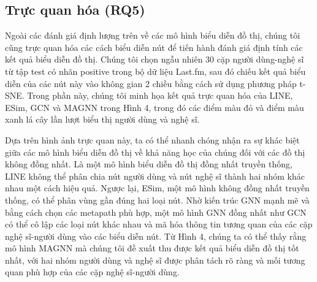 \subsection{Trực quan hóa (RQ5)}
Ngoài các đánh giá định lượng trên về các mô hình biểu diễn đồ thị, chúng tôi cũng trực quan hóa các cách biểu diễn nút để tiến hành đánh giá định tính các kết quả biểu diễn đồ thị. Chúng tôi chọn ngẫu nhiên 30 cặp người dùng-nghệ sĩ từ tập test có nhãn positive trong bộ dữ liệu Last.fm, sau đó chiếu kết quả biểu diễn của các nút này vào không gian 2 chiều bằng cách sử dụng phương pháp t-SNE. Trong phần này, chúng tôi minh họa kết quả trực quan hóa của LINE, ESim, GCN và MAGNN trong Hình 4, trong đó các điểm màu đỏ và điểm màu xanh lá cây lần lượt biểu thị người dùng và nghệ sĩ.

Dựa trên hình ảnh trực quan này, ta có thể nhanh chóng nhận ra sự khác biệt giữa các mô hình biểu diễn đồ thị về khả năng học của chúng đối với các đồ thị không đồng nhất. Là một mô hình biểu diễn đồ thị đồng nhất truyền thống, LINE không thể phân chia nút người dùng và nút nghệ sĩ thành hai nhóm khác nhau một cách hiệu quả. Ngược lại, ESim, một mô hình không đồng nhất truyền thống, có thể phân vùng gần đúng hai loại nút. Nhờ kiến trúc GNN mạnh mẽ và bằng cách chọn các metapath phù hợp, một mô hình GNN đồng nhất như GCN có thể cô lập các loại nút khác nhau và mã hóa thông tin tương quan của các cặp nghệ sĩ-người dùng vào các biểu diễn nút. Từ Hình 4, chúng ta có thể thấy rằng mô hình MAGNN mà chúng tôi đề xuất thu được kết quả biểu diễn đồ thị tốt nhất, với hai nhóm người dùng và nghệ sĩ được phân tách rõ ràng và mối tương quan phù hợp của các cặp nghệ sĩ-người dùng.
